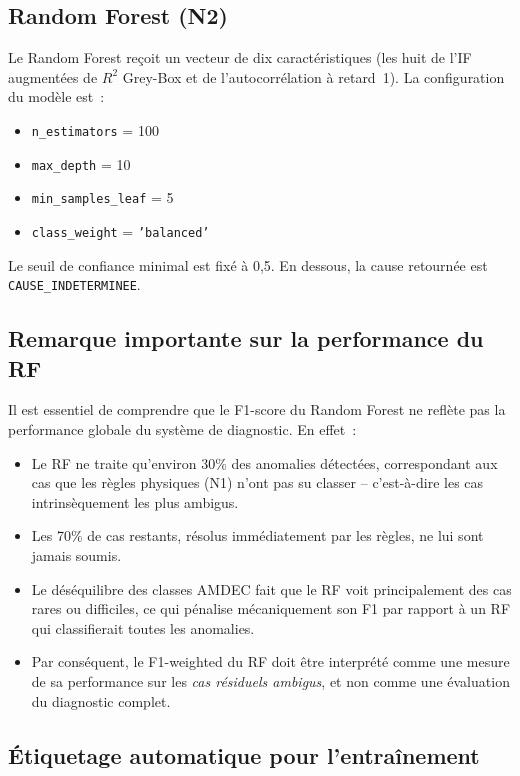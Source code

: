 \subsection{Random Forest (N2)}

Le Random Forest reçoit un vecteur de dix caractéristiques (les huit de l'IF augmentées de \(R^2\) Grey-Box et de l'autocorrélation à retard~1). La configuration du modèle est~:

\begin{itemize}
  \item \texttt{n\_estimators} = 100
  \item \texttt{max\_depth} = 10
  \item \texttt{min\_samples\_leaf} = 5
  \item \texttt{class\_weight} = \texttt{'balanced'}
\end{itemize}

Le seuil de confiance minimal est fixé à 0,5. En dessous, la cause retournée est \texttt{CAUSE\_INDETERMINEE}.

\subsection{Remarque importante sur la performance du RF}

Il est essentiel de comprendre que le F1-score du Random Forest ne reflète pas la performance globale du système de diagnostic. En effet~:

\begin{itemize}
  \item Le RF ne traite qu'environ 30\% des anomalies détectées, correspondant aux cas que les règles physiques (N1) n'ont pas su classer -- c'est-à-dire les cas intrinsèquement les plus ambigus.
  \item Les 70\% de cas restants, résolus immédiatement par les règles, ne lui sont jamais soumis.
  \item Le déséquilibre des classes AMDEC fait que le RF voit principalement des cas rares ou difficiles, ce qui pénalise mécaniquement son F1 par rapport à un RF qui classifierait toutes les anomalies.
  \item Par conséquent, le F1-weighted du RF doit être interprété comme une mesure de sa performance sur les \emph{cas résiduels ambigus}, et non comme une évaluation du diagnostic complet.
\end{itemize}

\subsection{Étiquetage automatique pour l'entraînement}

